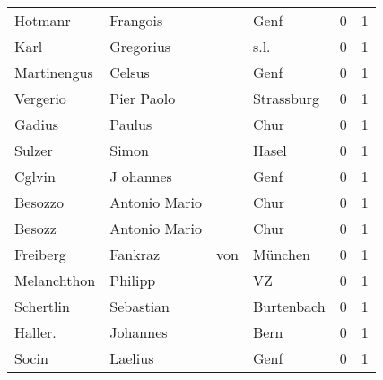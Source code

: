 \begin{tabular}{llllrr}
                  Hotmanr &                           Frangois &             &                                        Genf &          0 &         1 \\
                     Karl &                          Gregorius &             &                                        s.l. &          0 &         1 \\
              Martinengus &                             Celsus &             &                                        Genf &          0 &         1 \\
                 Vergerio &                         Pier Paolo &             &                                  Strassburg &          0 &         1 \\
                   Gadius &                             Paulus &             &                                        Chur &          0 &         1 \\
                   Sulzer &                              Simon &             &                                       Hasel &          0 &         1 \\
                   Cglvin &                          J ohannes &             &                                        Genf &          0 &         1 \\
                  Besozzo &                      Antonio Mario &             &                                        Chur &          0 &         1 \\
                   Besozz &                      Antonio Mario &             &                                        Chur &          0 &         1 \\
                 Freiberg &                            Fankraz &         von &                                     München &          0 &         1 \\
              Melanchthon &                            Philipp &             &                                          VZ &          0 &         1 \\
                Schertlin &                          Sebastian &             &                                  Burtenbach &          0 &         1 \\
                  Haller. &                           Johannes &             &                                        Bern &          0 &         1 \\
                    Socin &                            Laelius &             &                                        Genf &          0 &         1 \\

\end{tabular}
